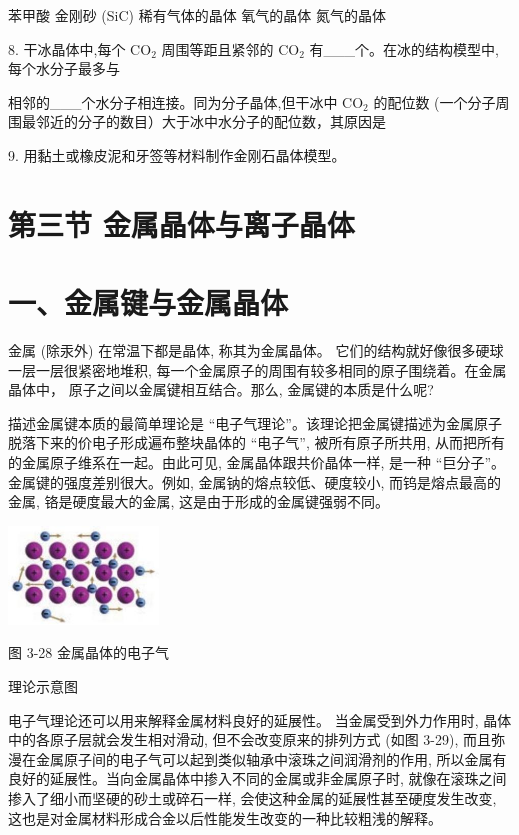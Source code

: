 \documentclass[10pt]{article}
\begin{document}
苯甲酸 金刚砂 (SiC) 稀有气体的晶体 氧气的晶体 氮气的晶体

8. 干冰晶体中,每个 \({\mathrm{{CO}}}_{2}\) 周围等距且紧邻的 \({\mathrm{{CO}}}_{2}\) 有\_\_\_个。在冰的结构模型中,每个水分子最多与

相邻的\_\_\_个水分子相连接。同为分子晶体,但干冰中 \({\mathrm{{CO}}}_{2}\) 的配位数 (一个分子周围最邻近的分子的数目）大于冰中水分子的配位数，其原因是

9. 用黏土或橡皮泥和牙签等材料制作金刚石晶体模型。

\section*{第三节 金属晶体与离子晶体}

\section*{一、金属键与金属晶体}

金属 (除汞外) 在常温下都是晶体, 称其为金属晶体。 它们的结构就好像很多硬球一层一层很紧密地堆积, 每一个金属原子的周围有较多相同的原子围绕着。在金属晶体中， 原子之间以金属键相互结合。那么, 金属键的本质是什么呢?

描述金属键本质的最简单理论是 “电子气理论”。该理论把金属键描述为金属原子脱落下来的价电子形成遍布整块晶体的 “电子气”, 被所有原子所共用, 从而把所有的金属原子维系在一起。由此可见, 金属晶体跟共价晶体一样, 是一种 “巨分子”。金属键的强度差别很大。例如, 金属钠的熔点较低、硬度较小, 而钨是熔点最高的金属, 铬是硬度最大的金属, 这是由于形成的金属键强弱不同。

\begin{center}
\includegraphics[max width=0.3\textwidth]{images/0190e026-5a11-7df7-bd27-54d09026ba7a_89_356141.jpg}
\end{center}

图 3-28 金属晶体的电子气

理论示意图

电子气理论还可以用来解释金属材料良好的延展性。 当金属受到外力作用时, 晶体中的各原子层就会发生相对滑动, 但不会改变原来的排列方式 (如图 3-29), 而且弥漫在金属原子间的电子气可以起到类似轴承中滚珠之间润滑剂的作用, 所以金属有良好的延展性。当向金属晶体中掺入不同的金属或非金属原子时, 就像在滚珠之间掺入了细小而坚硬的砂土或碎石一样, 会使这种金属的延展性甚至硬度发生改变, 这也是对金属材料形成合金以后性能发生改变的一种比较粗浅的解释。
\end{document}
